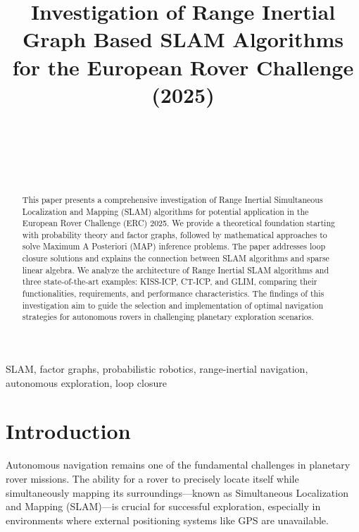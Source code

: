 \documentclass[journal]{IEEEtran}
\begin{document}
\title{Investigation of Range Inertial Graph Based SLAM Algorithms for the European Rover Challenge (2025)}

\author{
    \\
    
    \\
    \\
    \\

}

\maketitle

\begin{abstract}
    This paper presents a comprehensive investigation of Range Inertial Simultaneous Localization and Mapping (SLAM) algorithms for potential application in the European Rover Challenge (ERC) 2025. We provide a theoretical foundation starting with probability theory and factor graphs, followed by mathematical approaches to solve Maximum A Posteriori (MAP) inference problems. The paper addresses loop closure solutions and explains the connection between SLAM algorithms and sparse linear algebra. We analyze the architecture of Range Inertial SLAM algorithms and three state-of-the-art examples: KISS-ICP, CT-ICP, and GLIM, comparing their functionalities, requirements, and performance characteristics. The findings of this investigation aim to guide the selection and implementation of optimal navigation strategies for autonomous rovers in challenging planetary exploration scenarios.
\end{abstract}

\begin{IEEEkeywords}
    SLAM, factor graphs, probabilistic robotics, range-inertial navigation, autonomous exploration, loop closure
\end{IEEEkeywords}

\section{Introduction}

Autonomous navigation remains one of the fundamental challenges in planetary rover missions. The ability for a rover to precisely locate itself while simultaneously mapping its surroundings—known as Simultaneous Localization and Mapping (SLAM)—is crucial for successful exploration, especially in environments where external positioning systems like GPS are unavailable.
\end{document}
